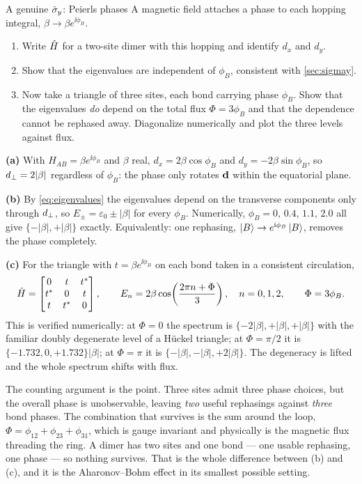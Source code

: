 \begin{problem}{A genuine $\hat{\sigma}_y$: Peierls phases}
\label{prob:peierls}
A magnetic field attaches a phase to each hopping integral, $\beta\to\beta e^{\ii\phi_B}$.
\begin{enumerate}[label=(\alph*),leftmargin=*,itemsep=1pt]
\item Write $\hat{H}$ for a two-site dimer with this hopping and identify $d_x$ and $d_y$.
\item Show that the eigenvalues are independent of $\phi_B$, consistent with
\cref{sec:sigmay}.
\item Now take a triangle of three sites, each bond carrying phase $\phi_B$. Show that
the eigenvalues \emph{do} depend on the total flux $\Phi = 3\phi_B$ and that the
dependence cannot be rephased away. Diagonalize numerically and plot the three levels
against flux.
\end{enumerate}
\end{problem}

\begin{solution}
\textbf{(a)} With $H_{AB} = \beta e^{\ii\phi_B}$ and $\beta$ real,
$d_x = 2\beta\cos\phi_B$ and $d_y = -2\beta\sin\phi_B$, so
$d_{\perp} = 2|\beta|$ regardless of $\phi_B$: the phase only rotates $\mathbf{d}$ within the
equatorial plane.

\textbf{(b)} By \cref{eq:eigenvalues} the eigenvalues depend on the transverse components
only through $d_{\perp}$, so $E_\pm = \varepsilon_0 \pm |\beta|$ for every $\phi_B$.
Numerically, $\phi_B = 0,\,0.4,\,1.1,\,2.0$ all give $\{-|\beta|,+|\beta|\}$ exactly.
Equivalently: one rephasing, $\ket{B}\to e^{\mathrm{i}\phi_B}\ket{B}$, removes the phase
completely.

\textbf{(c)} For the triangle with $t = \beta e^{\ii\phi_B}$ on each bond taken in a
consistent circulation,
\[
\hat{H} = \begin{bmatrix} 0 & t & t^{*}\\ t^{*} & 0 & t\\ t & t^{*} & 0\end{bmatrix},
\qquad
E_n = 2\beta\cos\!\left(\frac{2\pi n + \Phi}{3}\right),\quad n=0,1,2,
\qquad \Phi = 3\phi_B .
\]
This is verified numerically: at $\Phi=0$ the spectrum is
$\{-2|\beta|, +|\beta|, +|\beta|\}$ with the familiar doubly degenerate level of a
H\"uckel triangle; at $\Phi = \pi/2$ it is $\{-1.732,0,+1.732\}|\beta|$; at $\Phi = \pi$
it is $\{-|\beta|,-|\beta|,+2|\beta|\}$. The degeneracy is lifted and the whole spectrum
shifts with flux.

The counting argument is the point. Three sites admit three phase choices, but the
overall phase is unobservable, leaving \emph{two} useful rephasings against
\emph{three} bond phases. The combination that survives is the sum around the loop,
$\Phi = \phi_{12}+\phi_{23}+\phi_{31}$, which is gauge invariant and physically is the
magnetic flux threading the ring. A dimer has two sites and one bond --- one usable
rephasing, one phase --- so nothing survives. That is the whole difference between (b)
and (c), and it is the Aharonov--Bohm effect in its smallest possible setting.
\end{solution}

